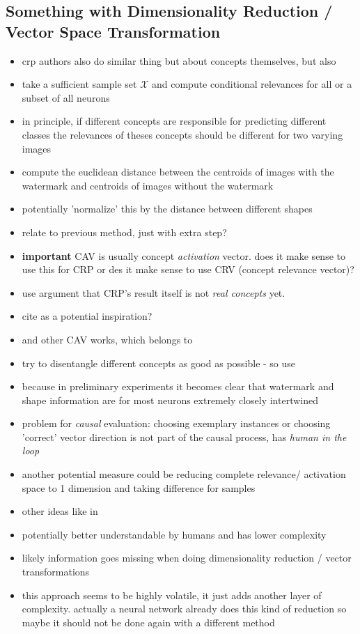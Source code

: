 {\color{gray}
\subsection{Something with Dimensionality Reduction / Vector Space Transformation}
\begin{itemize}
    \item crp authors also do similar thing but about concepts themselves, but also \cite{Vielhaben2022,Vielhaben2023}
    \item take a sufficient sample set $\mathcal{X}$ and compute conditional relevances for all or a subset of all neurons
    \item in principle, if different concepts are responsible for predicting different classes the relevances of theses concepts should be different for two varying images
    \item compute the euclidean distance between the centroids of images with the watermark and centroids of images without the watermark
    \item potentially 'normalize' this by the distance between different shapes
    \item relate to previous method, just with extra step?
    \item \textbf{important} CAV is usually concept \textit{activation} vector. does it make sense to use this for CRP or des it make sense to use CRV (concept relevance vector)?
    \item use argument that CRP's result itself is not \textit{real concepts} yet. 
    \item cite \cite{Dreyer2023a} as a potential inspiration?
    \item and other CAV works, which \cite{Kim2018} belongs to
    \item try to disentangle different concepts as good as possible - so use \cite{Leemann2023}
    \item because in preliminary experiments it becomes clear that watermark and shape information are for most neurons extremely closely intertwined
    \item problem for \textit{causal} evaluation: choosing exemplary instances or choosing 'correct' vector direction is not part of the causal process, has \textit{human in the loop}
    \item another potential measure could be reducing complete relevance/ activation space to 1 dimension and taking difference for samples
    \item other ideas like in \cite{Chormai2022,Leemann2023,Ghorbani2019,Zhang2021}
    \item potentially better understandable by humans and has lower complexity
    \item likely information goes missing when doing dimensionality reduction / vector transformations
    \item this approach seems to be highly volatile, it just adds another layer of complexity. actually a neural network already does this kind of reduction so maybe it should not be done again with a different method
\end{itemize}
}


